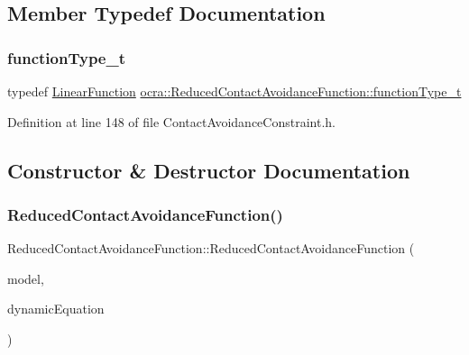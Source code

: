 \subsection{Member Typedef Documentation}
\hypertarget{classocra_1_1ReducedContactAvoidanceFunction_ae1d0c9b1c213515eabdb15cb7dc82869}{}\label{classocra_1_1ReducedContactAvoidanceFunction_ae1d0c9b1c213515eabdb15cb7dc82869} 
\subsubsection{\texorpdfstring{function\+Type\+\_\+t}{functionType\_t}}
{\footnotesize\ttfamily typedef \hyperlink{classocra_1_1LinearFunction}{Linear\+Function} \hyperlink{classocra_1_1ReducedContactAvoidanceFunction_ae1d0c9b1c213515eabdb15cb7dc82869}{ocra\+::\+Reduced\+Contact\+Avoidance\+Function\+::function\+Type\+\_\+t}}



Definition at line 148 of file Contact\+Avoidance\+Constraint.\+h.



\subsection{Constructor \& Destructor Documentation}
\hypertarget{classocra_1_1ReducedContactAvoidanceFunction_ae2183d53a13985590ee4f5cf59083803}{}\label{classocra_1_1ReducedContactAvoidanceFunction_ae2183d53a13985590ee4f5cf59083803} 
\subsubsection{\texorpdfstring{Reduced\+Contact\+Avoidance\+Function()}{ReducedContactAvoidanceFunction()}}
{\footnotesize\ttfamily Reduced\+Contact\+Avoidance\+Function\+::\+Reduced\+Contact\+Avoidance\+Function (\begin{DoxyParamCaption}\item[{const \hyperlink{classocra_1_1Model}{Model} \&}]{model,  }\item[{const \hyperlink{classocra_1_1FullDynamicEquationFunction}{Full\+Dynamic\+Equation\+Function} \&}]{dynamic\+Equation }\end{DoxyParamCaption})}

